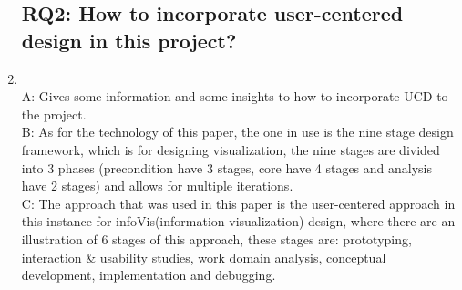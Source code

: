 \documentclass{article}
\begin{document}
\begin{enumerate}
\subsection{RQ2: How to incorporate user-centered design in this project?}
	\item  \cite{akanmu2014user}
		\\A: Gives some information and some insights to how to incorporate UCD to the project.
		\\B: As for the technology of this paper, the one in use is the nine stage design framework, which is for designing visualization, the nine stages are divided into 3 phases (precondition have 3 stages, core have 4 stages and analysis have 2 stages) and allows for multiple iterations.
		\\C: The approach that was used in this paper is the user-centered approach in this instance for infoVis(information visualization) design, where there are an illustration of 6 stages of this approach, these stages are: prototyping, interaction & usability studies, work domain analysis, conceptual development, implementation and debugging.

\end{enumerate}
\end{document}
